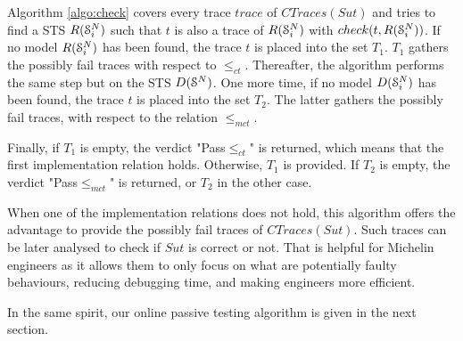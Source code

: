 Algorithm \ref{algo:check} covers every trace $trace$ of
$CTraces({Sut})$ and tries to find a STS $R(\EuScript{S}_i^{N})$
such that $t$ is also a trace of $R(\EuScript{S}_i^{N})$ with
$check(t, R(\EuScript{S}_i^{N}))$.  If no model
$R(\EuScript{S}_i^{N})$ has been found, the trace $t$ is placed
into the set $T_1$. $T_1$ gathers the possibly fail traces
with respect to $\leq_{ct}$. Thereafter, the algorithm performs the same
step but on the STS $D(\EuScript{S}^{N})$. One more time, if no
model $D(\EuScript{S}_i^{N})$ has been found, the trace $t$ is placed
into the set $T_2$.  The latter gathers the possibly fail traces,
with respect to the relation $\leq_{mct}$.

Finally, if $T_1$ is empty, the verdict "Pass$\leq_{ct}$" is
returned, which means that the first implementation relation holds.
Otherwise, $T_1$ is provided. If $T_2$ is empty, the verdict
"Pass$\leq_{mct}$" is returned, or $T_2$ in the other case.

When one of the implementation relations does not hold, this
algorithm offers the advantage to provide the possibly fail
traces of $CTraces({Sut})$. Such traces can be later analysed to
check if $\mathit{Sut}$ is correct or not. That is helpful for
Michelin engineers as it allows them to only focus on what are
potentially faulty behaviours, reducing debugging time, and
making engineers more efficient.

In the same spirit, our online passive testing algorithm is given
in the next section.
